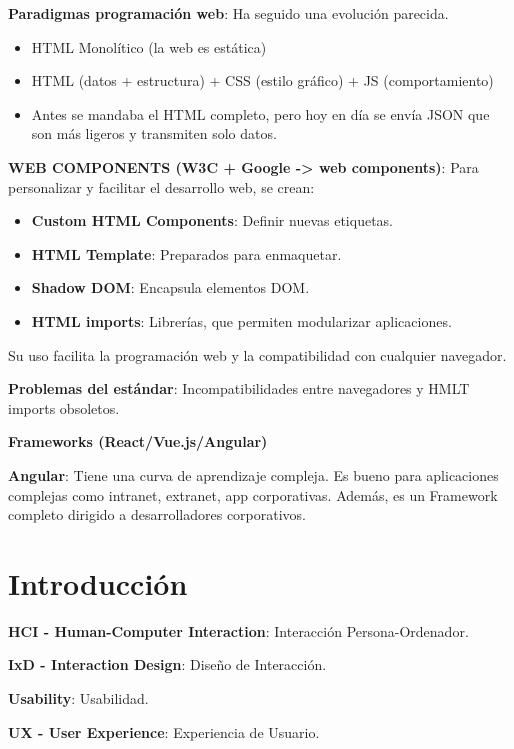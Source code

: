 \textbf{Paradigmas programación web}: Ha seguido una evolución parecida.

\begin{itemize}
\item
  HTML Monolítico (la web es estática)
\item
  HTML (datos + estructura) + CSS (estilo gráfico) + JS (comportamiento)
\item
  Antes se mandaba el HTML completo, pero hoy en día se envía JSON que
  son más ligeros y transmiten solo datos.
\end{itemize}

\textbf{WEB COMPONENTS (W3C + Google -\textgreater{} web components)}:
Para personalizar y facilitar el desarrollo web, se crean:

\begin{itemize}
\item
  \textbf{Custom HTML Components}: Definir nuevas etiquetas.
\item
  \textbf{HTML Template}: Preparados para enmaquetar.
\item
  \textbf{Shadow DOM}: Encapsula elementos DOM.
\item
  \textbf{HTML imports}: Librerías, que permiten modularizar
  aplicaciones.
\end{itemize}

Su uso facilita la programación web y la compatibilidad con cualquier
navegador.

\textbf{Problemas del estándar}: Incompatibilidades entre navegadores y
HMLT imports obsoletos.

\textbf{Frameworks (React/Vue.js/Angular)}

\textbf{Angular}: Tiene una curva de aprendizaje compleja. Es bueno para
aplicaciones complejas como intranet, extranet, app corporativas.
Además, es un Framework completo dirigido a desarrolladores
corporativos.

\hypertarget{introducciuxf3n}{%
\section{Introducción}\label{introducciuxf3n}}

\textbf{HCI - Human-Computer Interaction}: Interacción
Persona-Ordenador.

\textbf{IxD - Interaction Design}: Diseño de Interacción.

\textbf{Usability}: Usabilidad.

\textbf{UX - User Experience}: Experiencia de Usuario.

